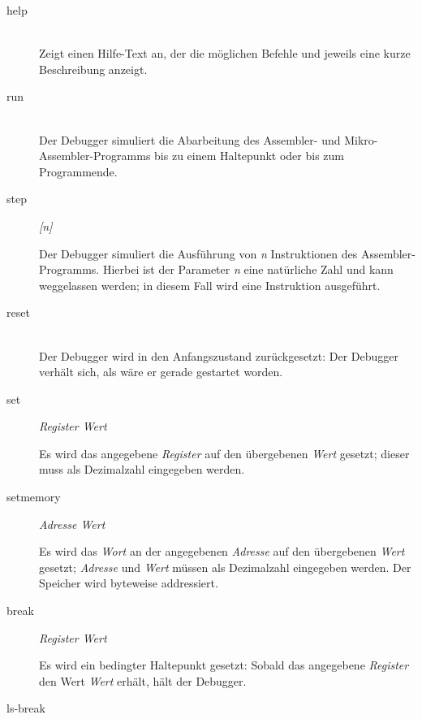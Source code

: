 \begin{description}
\item[help] \hspace*{\fill}\\

Zeigt einen Hilfe-Text an, der die möglichen Befehle und jeweils eine kurze Beschreibung anzeigt.

\item[run] \hspace*{\fill}\\

Der Debugger simuliert die Abarbeitung des Assembler- und Mikro-Assembler-Programms bis zu einem Haltepunkt oder bis zum Programmende.

\item[step] \emph{[n]}

Der Debugger simuliert die Ausführung von \emph{n} Instruktionen des Assembler-Programms. Hierbei ist der Parameter \emph{n} eine natürliche Zahl und kann weggelassen werden; in diesem Fall wird eine Instruktion ausgeführt.

\item[reset] \hspace*{\fill}\\

Der Debugger wird in den Anfangszustand zurückgesetzt: Der Debugger verhält sich, als wäre er gerade gestartet worden.

\item[set] \emph{Register Wert}

Es wird das angegebene \emph{Register} auf den übergebenen \emph{Wert} gesetzt; dieser muss als Dezimalzahl eingegeben werden.

\item[setmemory] \emph{Adresse Wert}

Es wird das \emph{Wort} an der angegebenen \emph{Adresse} auf den übergebenen \emph{Wert} gesetzt; \emph{Adresse} und \emph{Wert} müssen als Dezimalzahl eingegeben werden. Der Speicher wird byteweise addressiert.

\item[break] \emph{Register Wert}

Es wird ein bedingter Haltepunkt gesetzt: Sobald das angegebene \emph{Register} den Wert \emph{Wert} erhält, hält der Debugger.

\item[ls-break] \hspace*{\fill}\\


\end{description}
